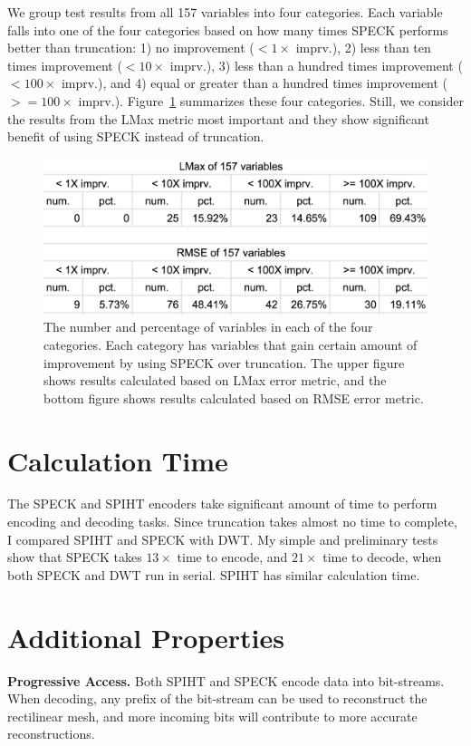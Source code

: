 \documentclass[review]{vgtc}                 %
\begin{document}
We group test results from all 157 variables into four categories.
%
Each variable falls into one of the four categories 
based on how many times SPECK performs better than truncation:
1) no improvement ($< 1\times$ imprv.),
2) less than ten times improvement ($< 10\times$ imprv.),
3) less than a hundred times improvement ($< 100\times$ imprv.), 
and 4) equal or greater than a hundred times improvement
($>= 100 \times$ imprv.).
%
Figure~\ref{fig:histogram} summarizes these four categories.
%
Still, we consider the results from the LMax metric most important
and they show significant benefit of using SPECK instead of truncation.

\begin{figure}
  \centering
    \includegraphics[width=1\columnwidth]{figs/histogram.png}
  \caption{
The number and percentage of variables in each of the four categories.
%
Each category has variables that gain certain amount of improvement by
using SPECK over truncation.
%
The upper figure shows results calculated based on LMax error metric,
and the bottom figure shows results calculated based on RMSE error metric.
}
  \label{fig:histogram}
\end{figure}


\section{Calculation Time}
%
The SPECK and SPIHT encoders take significant amount of time to perform
encoding and decoding tasks. 
%
Since truncation takes almost no time to complete, I compared
SPIHT and SPECK with DWT.
%
My simple and preliminary tests show that SPECK takes $13\times$ time to encode,
and $21\times$ time to decode, when both SPECK and DWT run in serial.
%
SPIHT has similar calculation time.


\section{Additional Properties}
%
\textbf{Progressive Access.}
%
Both SPIHT and SPECK encode data into bit-streams. 
%
When decoding, any prefix of the bit-stream can be used to reconstruct
the rectilinear mesh, and more incoming bits will contribute to 
more accurate reconstructions.
\end{document}
